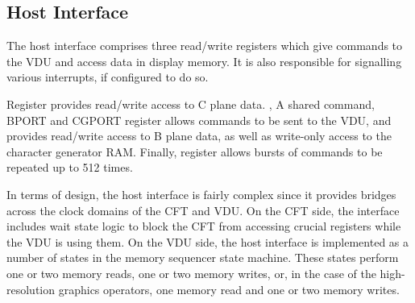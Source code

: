 

\subsection{Host Interface}
\label{sec:vdu:host-interface}

The host interface comprises three read/write registers which give commands to
the VDU and access data in display memory. It is also responsible for
signalling various interrupts, if configured to do so.

Register  provides read/write access to C plane data. , A
shared command, BPORT and CGPORT register allows commands to be sent to the
VDU, and provides read/write access to B plane data, as well as write-only
access to the character generator RAM. Finally, register  allows
bursts of commands to be repeated up to 512 times.

In terms of design, the host interface is fairly complex since it provides
bridges across the clock domains of the CFT and VDU. On the CFT side, the
interface includes wait state logic to block the CFT from accessing crucial
registers while the VDU is using them. On the VDU side, the host interface is
implemented as a number of states in the memory sequencer state machine. These
states perform one or two memory reads, one or two memory writes, or, in the
case of the high-resolution graphics operators, one memory read and one or two
memory writes.









